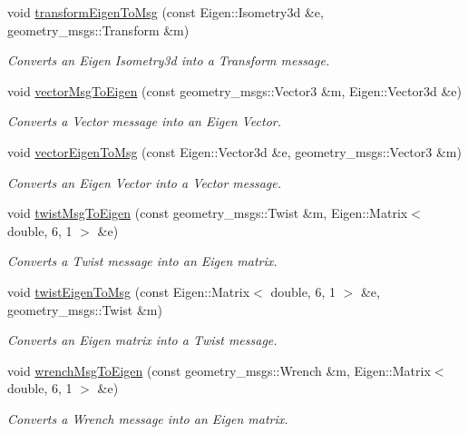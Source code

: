 \begin{DoxyCompactItemize}
void \hyperlink{namespacetf_a27f1bbeb711fea43bfa39a354a064296}{transform\-Eigen\-To\-Msg} (const Eigen\-::\-Isometry3d \&e, geometry\-\_\-msgs\-::\-Transform \&m)
\begin{DoxyCompactList}\small\item\em Converts an Eigen Isometry3d into a Transform message. \end{DoxyCompactList}\item 
void \hyperlink{namespacetf_aed6a8b793cfddfdfcd00bee42ee44bbc}{vector\-Msg\-To\-Eigen} (const geometry\-\_\-msgs\-::\-Vector3 \&m, Eigen\-::\-Vector3d \&e)
\begin{DoxyCompactList}\small\item\em Converts a Vector message into an Eigen Vector. \end{DoxyCompactList}\item 
void \hyperlink{namespacetf_aae84e65007df198d68f823a6d71864b9}{vector\-Eigen\-To\-Msg} (const Eigen\-::\-Vector3d \&e, geometry\-\_\-msgs\-::\-Vector3 \&m)
\begin{DoxyCompactList}\small\item\em Converts an Eigen Vector into a Vector message. \end{DoxyCompactList}\item 
void \hyperlink{namespacetf_ad3ebccf80d5f154e08461e34d46f9308}{twist\-Msg\-To\-Eigen} (const geometry\-\_\-msgs\-::\-Twist \&m, Eigen\-::\-Matrix$<$ double, 6, 1 $>$ \&e)
\begin{DoxyCompactList}\small\item\em Converts a Twist message into an Eigen matrix. \end{DoxyCompactList}\item 
void \hyperlink{namespacetf_a0d8634c904647472b9437e655b37f85f}{twist\-Eigen\-To\-Msg} (const Eigen\-::\-Matrix$<$ double, 6, 1 $>$ \&e, geometry\-\_\-msgs\-::\-Twist \&m)
\begin{DoxyCompactList}\small\item\em Converts an Eigen matrix into a Twist message. \end{DoxyCompactList}\item 
void \hyperlink{namespacetf_a78e50852f7a0d1b4006c8ceebb78aec8}{wrench\-Msg\-To\-Eigen} (const geometry\-\_\-msgs\-::\-Wrench \&m, Eigen\-::\-Matrix$<$ double, 6, 1 $>$ \&e)
\begin{DoxyCompactList}\small\item\em Converts a Wrench message into an Eigen matrix. \end{DoxyCompactList}\item 

\end{DoxyCompactItemize}
